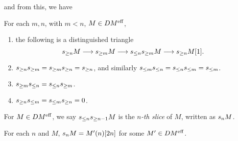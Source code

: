 and from this, we have

\begin{prop}
For each $m, n$, with $m < n$, $M \in DM^{\mathrm{eff}}$,

\begin{enumerate}
\item the following is a distinguished triangle
\begin{equation}
s_{\geq n}M \longrightarrow s_{\geq m}M \longrightarrow s_{\leq n}s_{\geq m}M \longrightarrow s_{\geq n}M[1].
\end{equation}

\item $s_{\geq n}s_{\geq m} = s_{\geq m}s_{\geq n} = s_{\geq n}$, and 
similarly $s_{\leq m}s_{\leq n} = s_{\leq n}s_{\leq m} = s_{\leq m}$.

\item $s_{\geq m}s_{\leq n} = s_{\leq n}s_{\geq m}$.

\item $s_{\geq n}s_{\leq m} = s_{\leq m}s_{\geq n} = 0$.
\end{enumerate}
\end{prop}

\begin{definition}
For $M \in DM^{\mathrm{eff}}$, we say $s_{\leq n}s_{\geq n - 1}M$ is the 
\emph{$n$-th slice} of $M$, written as $s_nM$.
\end{definition}

\begin{prop}
For each $n$ and $M$, $s_nM = M'(n)[2n]$ for some $M' \in
DM^{\mathrm{eff}}$. 
\end{prop}
